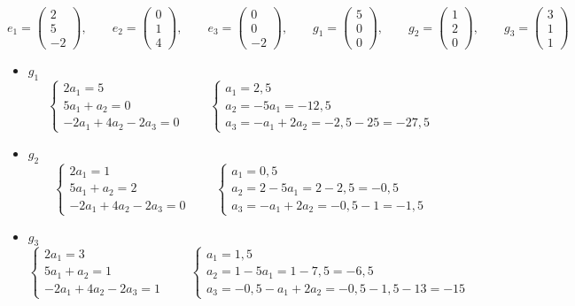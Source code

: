$$ e_1 =
\begin{pmatrix}
	2 \\
    5 \\
    -2
\end{pmatrix}, \qquad e_2 =
\begin{pmatrix}
	0 \\
    1 \\
    4
\end{pmatrix}, \qquad e_3 =
\begin{pmatrix}
	0 \\
    0 \\
    -2
\end{pmatrix}, \qquad g_1 =
\begin{pmatrix}
	5 \\
    0 \\
    0
\end{pmatrix}, \qquad g_2 =
\begin{pmatrix}
	1 \\
    2 \\
    0
\end{pmatrix}, \qquad g_3 =
\begin{pmatrix}
	3 \\
    1 \\
    1
\end{pmatrix} $$
\begin{itemize}
	\item $ g_1 $
    $$
    \begin{cases}
    	2a_1 = 5 \\
        5a_1 + a_2 = 0 \\
        -2a_1 + 4a_2 - 2a_3 = 0
    \end{cases} \qquad
    \begin{cases}
    	a_1 = 2,5 \\
        a_2 = -5a_1 = -12,5 \\
        a_3 = -a_1 + 2a_2 = -2,5 - 25 = -27,5
    \end{cases} $$
    \item $ g_2 $
    $$
    \begin{cases}
    	2a_1 = 1 \\
        5a_1 + a_2 = 2 \\
        -2a_1 + 4a_2 - 2a_3 = 0
    \end{cases} \qquad
    \begin{cases}
    	a_1 = 0,5 \\
        a_2 = 2 - 5a_1 = 2 - 2,5 = -0,5 \\
        a_3 = -a_1 + 2a_2 = -0,5 - 1 = -1,5
    \end{cases} $$
    \item $ g_3 $
    $$
    \begin{cases}
    	2a_1 = 3 \\
        5a_1 + a_2 = 1 \\
        -2a_1 + 4a_2 - 2a_3 = 1
    \end{cases} \qquad
    \begin{cases}
    	a_1 = 1,5 \\
        a_2 = 1 - 5a_1 = 1 - 7,5 = -6,5 \\
        a_3 = -0,5 - a_1 + 2a_2 = -0,5 - 1,5 - 13 = -15
    \end{cases} $$
\end{itemize}

